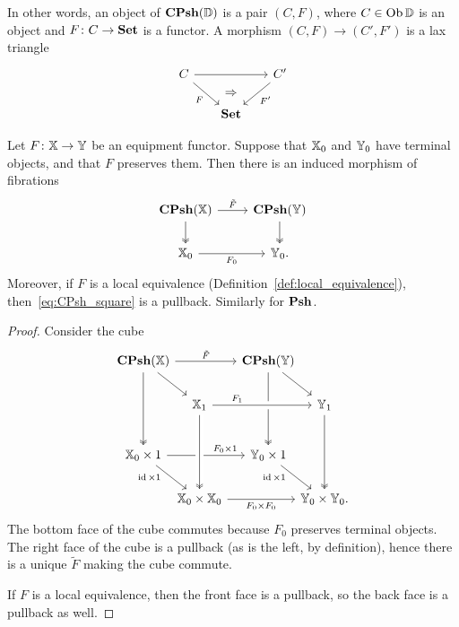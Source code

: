 \documentclass[12pt,oneside,article,draft]{memoir}
\begin{document}
In other words, an object of $\mathbf{CPsh}(\mathbb{D})$ is a pair $(C,F)$, where $C\in\operatorname{Ob}\mathbb{D}$ is an object and $F\colon C\to\mathbf{Set}$ is a functor. A morphism $(C,F)\to(C',F')$ is a lax triangle
\begin{equation*}
	\begin{tikzcd}[column sep=.6cm]
		C\ar[rr]\ar[rd,"F"']&\ar[d,phantom,"\Rightarrow"]&C'\ar[dl,"F'"]\\
		&\Set
	\end{tikzcd}
\end{equation*}

\begin{lemma}\label{lem:Psh_pullback}
   Let $F\colon\mathbb{X}\to\mathbb{Y}$ be an equipment functor. Suppose that $\mathbb{X}_0$ and
   $\mathbb{Y}_0$ have terminal objects, and that $F$ preserves them. Then there is an induced
   morphism of fibrations
   \begin{equation}\label{eq:CPsh_square}
      \begin{tikzcd}
         \CPsh(\dcat{X}) \ar[r,"\tilde{F}"] \ar[d,two heads] %
            & \CPsh(\dcat{Y}) \ar[d,two heads] \\
         \dcat{X}_0 \ar[r,"F_0"']
            & \dcat{Y}_0.
      \end{tikzcd}
   \end{equation}
   Moreover, if $F$ is a local equivalence (Definition~\ref{def:local_equivalence}),
   then~\eqref{eq:CPsh_square} is a pullback.  Similarly for $\mathbf{Psh}$.
\end{lemma}
\begin{proof}
   Consider the cube
   \begin{equation*}
      \begin{tikzcd}[row sep={40,between origins}, column sep={55,between origins}]
         \CPsh(\dcat{X}) \ar[rr,"\tilde{F}"] \ar[dr] \ar[dd,two heads]
         &[-10] & \CPsh(\dcat{Y}) \ar[dd,two heads] \ar[dr] &[-10] \\[-5]
         & \dcat{X}_1 \ar[rr,crossing over,"F_1" near start]
            && \dcat{Y}_1 \ar[dd,two heads] \\
         \dcat{X}_0\times 1 \ar[rr,"F_0\times 1" pos=.75]
               \ar[dr,"\id\times 1"' {pos=.25,inner sep=2pt}]
            && \dcat{Y}_0\times 1 \ar[dr,"\id\times 1"' {pos=.25,inner sep=2pt}] & \\[-5]
         & \dcat{X}_0\times\dcat{X}_0 \ar[rr,"F_0\times F_0"']
               \ar[from=uu,crossing over,two heads]
            && \dcat{Y}_0\times\dcat{Y}_0.
      \end{tikzcd}
   \end{equation*}
   The bottom face of the cube commutes because $F_0$ preserves terminal objects. The right face of
   the cube is a pullback (as is the left, by definition), hence there is a unique $\tilde{F}$ making the cube commute.

   If $F$ is a local equivalence, then the front face is a pullback, so the back face is a pullback as well.
\end{proof}
\end{document}
